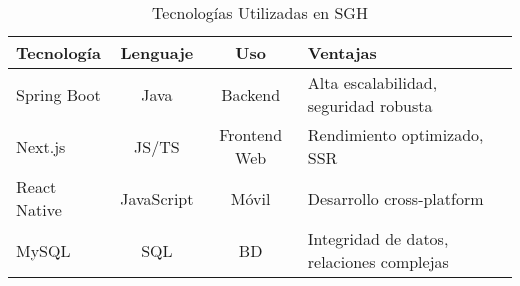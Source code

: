 \begin{table}[htbp]
\centering
\caption{Tecnologías Utilizadas en SGH}
\label{tab:frameworks}
\footnotesize
\begin{tabular}{lccp{4cm}}
\toprule
\textbf{Tecnología} & \textbf{Lenguaje} & \textbf{Uso} & \textbf{Ventajas} \\
\midrule
Spring Boot & Java & Backend & Alta escalabilidad, seguridad robusta \\
Next.js & JS/TS & Frontend Web & Rendimiento optimizado, SSR \\
React Native & JavaScript & Móvil & Desarrollo cross-platform \\
MySQL & SQL & BD & Integridad de datos, relaciones complejas \\
\bottomrule
\end{tabular}
\end{table}